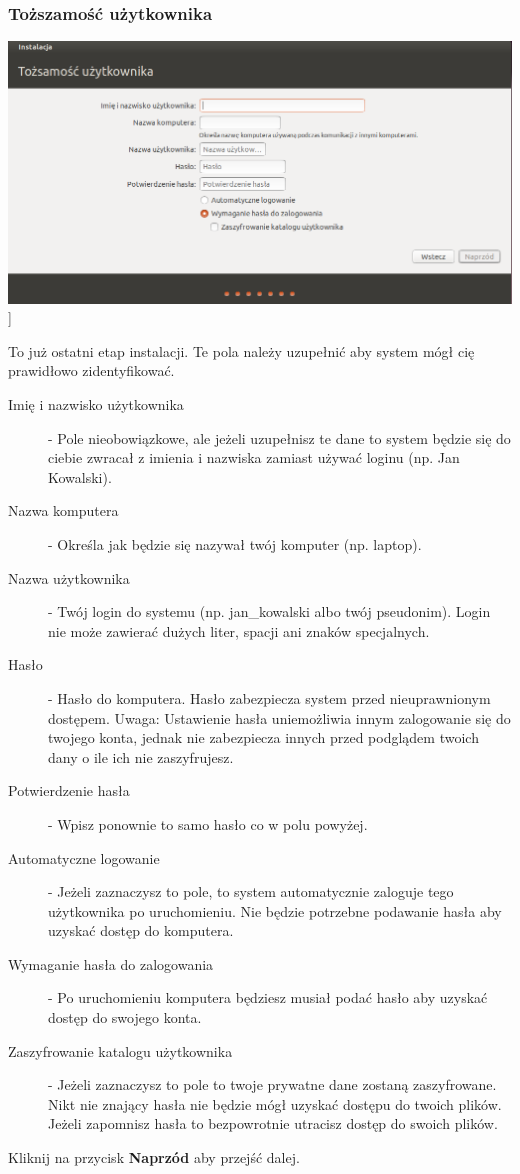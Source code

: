 \subsubsection{Toższamość użytkownika}
\begin{center}
        \includegraphics[scale=0.5]{images/instalator_dane.png}]
\end{center}
To już ostatni etap instalacji. Te pola należy uzupełnić aby system mógł cię prawidłowo zidentyfikować.
\begin{description}
\item[Imię i nazwisko użytkownika] - Pole nieobowiązkowe, ale jeżeli uzupełnisz te dane to system będzie się do ciebie zwracał z imienia i nazwiska zamiast używać loginu (np. Jan Kowalski).
\item[Nazwa komputera] - Określa jak będzie się nazywał twój komputer (np. laptop).
\item[Nazwa użytkownika] - Twój login do systemu (np. jan\_kowalski albo twój pseudonim). Login nie może zawierać dużych liter, spacji ani znaków specjalnych.
\item[Hasło] - Hasło do komputera. Hasło zabezpiecza system przed nieuprawnionym dostępem. Uwaga: Ustawienie hasła uniemożliwia innym zalogowanie się do twojego konta, jednak nie zabezpiecza innych przed podglądem twoich dany o ile ich nie zaszyfrujesz. 
\item[Potwierdzenie hasła] - Wpisz ponownie to samo hasło co w polu powyżej.
\item[Automatyczne logowanie] - Jeżeli zaznaczysz to pole, to system automatycznie zaloguje tego użytkownika po uruchomieniu. Nie będzie potrzebne podawanie hasła aby uzyskać dostęp do komputera.
\item[Wymaganie hasła do zalogowania] - Po uruchomieniu komputera będziesz musiał podać hasło aby uzyskać dostęp do swojego konta.
\item[Zaszyfrowanie katalogu użytkownika] - Jeżeli zaznaczysz to pole to twoje prywatne dane zostaną zaszyfrowane. Nikt nie znający hasła nie będzie mógł uzyskać dostępu do twoich plików. Jeżeli zapomnisz hasła to bezpowrotnie utracisz dostęp do swoich plików.
\end{description}
\begin{flushright}
Kliknij na przycisk \textbf{Naprzód} aby przejść dalej.
\end{flushright}
\clearpage
